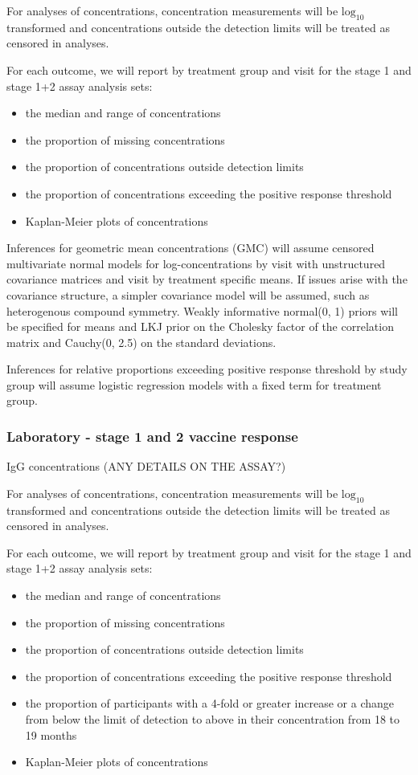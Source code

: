 \documentclass{bmcart}
\begin{document}
For analyses of concentrations, concentration measurements will be $\text{log}_{10}$ transformed and concentrations outside the detection limits will be treated as censored in analyses.

For each outcome, we will report by treatment group and visit for the stage 1 and stage 1+2 assay analysis sets:
\begin{itemize}
	\item the median and range of concentrations
	\item the proportion of missing concentrations
	\item the proportion of concentrations outside detection limits
	\item the proportion of concentrations exceeding the positive response threshold
	\item Kaplan-Meier plots of concentrations
\end{itemize}

Inferences for geometric mean concentrations (GMC) will assume censored multivariate normal models for log-concentrations by visit with unstructured covariance matrices and visit by treatment specific means.
If issues arise with the covariance structure, a simpler covariance model will be assumed, such as heterogenous compound symmetry.
Weakly informative normal(0, 1) priors will be specified for means and LKJ prior on the Cholesky factor of the correlation matrix and Cauchy(0, 2.5) on the standard deviations.

Inferences for relative proportions exceeding positive response threshold by study group will assume logistic regression models with a fixed term for treatment group.

\subsubsection*{Laboratory - stage 1 and 2 vaccine response}

IgG concentrations (ANY DETAILS ON THE ASSAY?)

For analyses of concentrations, concentration measurements will be $\text{log}_{10}$ transformed and concentrations outside the detection limits will be treated as censored in analyses.

For each outcome, we will report by treatment group and visit for the stage 1 and stage 1+2 assay analysis sets:
\begin{itemize}
	\item the median and range of concentrations
	\item the proportion of missing concentrations
	\item the proportion of concentrations outside detection limits
	\item the proportion of concentrations exceeding the positive response threshold
	\item the proportion of participants with a 4-fold or greater increase or a change from below the limit of detection to above in their concentration from 18 to 19 months 
	\item Kaplan-Meier plots of concentrations
\end{itemize}
\end{document}
